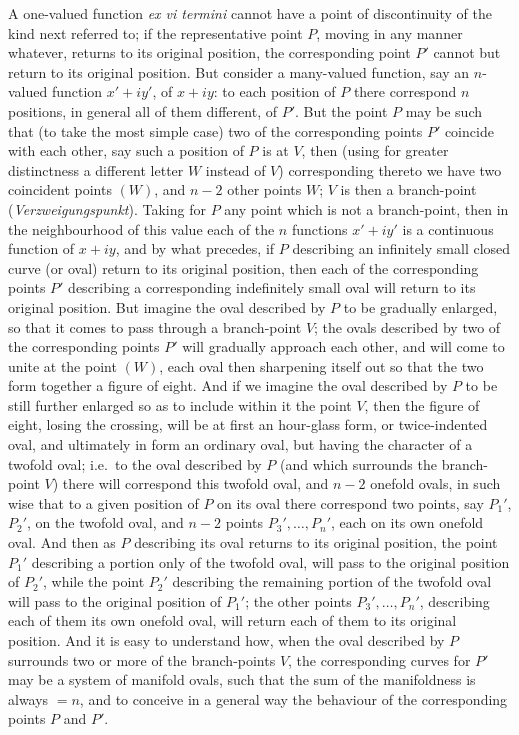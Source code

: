 \documentclass[11pt,a4paper]{article}
\begin{document}
A one-valued function \textit{ex vi termini} cannot have a point of discontinuity of the kind next referred to; if the representative point $P$, moving in any manner whatever, returns to its original position, the corresponding point $P'$ cannot but return to its original position. But consider a many-valued function, say an $n$-valued function $x' + iy'$, of $x + iy$: to each position of $P$ there correspond $n$ positions, in general all of them different, of $P'$. But the point $P$ may be such that (to take the most simple case) two of the corresponding points $P'$ coincide with each other, say such a position of $P$ is at $V$, then (using for greater distinctness a different letter $W$ instead of $V$) corresponding thereto we have two coincident points $(W)$, and $n - 2$ other points $W$; $V$ is then a branch-point (\textit{Verzweigungspunkt}). Taking for $P$ any point which is not a branch-point, then in the neighbourhood of this value each of the $n$ functions $x' + iy'$ is a continuous function of $x + iy$, and by what precedes, if $P$ describing an infinitely small closed curve (or oval) return to its original position, then each of the corresponding points $P'$ describing a corresponding indefinitely small oval will return to its original position. But imagine the oval described by $P$ to be gradually enlarged, so that it comes to pass through a branch-point $V$; the ovals described by two of the corresponding points $P'$ will gradually approach each other, and will come to unite at the point $(W)$, each oval then sharpening itself out so that the two form together a figure of eight. And if we imagine the oval described by $P$ to be still further enlarged so as to include within it the point $V$, then the figure of eight, losing the crossing, will be at first an hour-glass form, or twice-indented oval, and ultimately in form an ordinary oval, but having the character of a twofold oval; i.e.\ to the oval described by $P$ (and which surrounds the branch-point $V$) there will correspond this twofold oval, and $n - 2$ onefold ovals, in such wise that to a given position of $P$ on its oval there correspond two points, say $P_{1}'$, $P_{2}'$, on the twofold oval, and $n - 2$ points $P_{3}', \ldots, P_{n}'$, each on its own onefold oval. And then as $P$ describing its oval returns to its original position, the point $P_{1}'$ describing a portion only of the twofold oval, will pass to the original position of $P_{2}'$, while the point $P_{2}'$ describing the remaining portion of the twofold oval will pass to the original position of $P_{1}'$; the other points $P_{3}', \ldots, P_{n}'$, describing each of them its own onefold oval, will return each of them to its original position. And it is easy to understand how, when the oval described by $P$ surrounds two or more of the branch-points $V$, the corresponding curves for $P'$ may be a system of manifold ovals, such that the sum of the manifoldness is always $= n$, and to conceive in a general way the behaviour of the corresponding points $P$ and $P'$.
\end{document}
